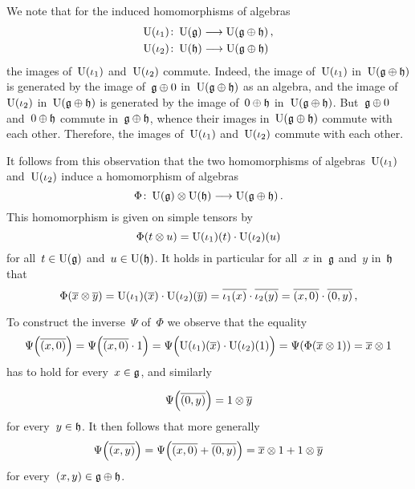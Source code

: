 \begin{example}
\begin{itemize}
			We note that for the induced homomorphisms of algebras
			\begin{align*}
				\Univ(\iota_1) &\colon \Univ(\glie) \to \Univ(\glie \oplus \hlie) \,, \\
				\Univ(\iota_2) &\colon \Univ(\hlie) \to \Univ(\glie \oplus \hlie)
			\end{align*}
			the images of~$\operatorname{U}(\iota_1)$ and~$\operatorname{U}(\iota_2)$ commute.
			Indeed, the image of~$\operatorname{U}(\iota_1)$ in~$\operatorname{U}(\mathfrak{g} \oplus \mathfrak{h})$ is generated by the image of~$\mathfrak{g} \oplus 0$ in~$\operatorname{U}(\mathfrak{g} \oplus \mathfrak{h})$ as an algebra, and the image of~$\operatorname{U}(\iota_2)$ in~$\operatorname{U}(\mathfrak{g} \oplus \mathfrak{h})$ is generated by the image of~$0 \oplus \mathfrak{h}$ in~$\operatorname{U}(\mathfrak{g} \oplus \mathfrak{h})$.
			But~$\mathfrak{g} \oplus 0$ and~$0 \oplus \mathfrak{h}$ commute in~$\mathfrak{g} \oplus \mathfrak{h}$, whence their images in~$\operatorname{U}(\mathfrak{g} \oplus \mathfrak{h})$ commute with each other.
			Therefore, the images of~$\operatorname{U}(\iota_1)$ and~$\operatorname{U}(\iota_2)$ commute with each other.

			It follows from this observation that the two homomorphisms of algebras~$\operatorname{U}( \iota_1 )$ and~$\operatorname{U}( \iota_2 )$ induce a homomorphism of algebras
			\[
				\Phi
				\colon
				\Univ(\glie) \tensor \Univ(\hlie)
				\to
				\Univ(\glie \oplus \hlie) \,.
			\]
			This homomorphism is given on simple tensors by
			\[
				\Phi(t \otimes u)
				=
				\operatorname{U}(\iota_1)(t) \cdot \operatorname{U}(\iota_2)(u)
			\]
			for all~$t \in \operatorname{U}(\mathfrak{g})$ and~$u \in \operatorname{U}(\mathfrak{h})$.
			It holds in particular for all~$x$ in~$\mathfrak{g}$ and~$y$ in~$\mathfrak{h}$ that
			\[
				\Phi(\overline{x} \otimes \overline{y})
				=
				\operatorname{U}(\iota_1)( \overline{x} )
				\cdot
				\operatorname{U}(\iota_2)( \overline{y} )
				=
				\overline{ \iota_1(x) }
				\cdot
				\overline{ \iota_2(y) }
				=
				\overline{(x,0)} \cdot \overline{(0,y)}  \,,
			\]

			To construct the inverse~$\Psi$ of~$\Phi$ we observe that the equality
			\[
				\Psi\Bigl( \overline{(x,0)} \Bigr)
				=
				\Psi\Bigl( \overline{(x,0)} \cdot 1 \Bigr)
				=
				\Psi\Bigl( \operatorname{U}(\iota_1)( \overline{x} ) \cdot \operatorname{U}(\iota_2)(1) \Bigr)
				=
				\Psi( \Phi( \overline{x} \otimes 1 ) )
				=
				\overline{x} \otimes 1
			\]
			has to hold for every~$x \in \mathfrak{g}$, and similarly
			
			\[
				\Psi\Bigl( \overline{(0,y)} \Bigr)
				=
				1 \otimes \overline{y}
			\]
			for every~$y \in \mathfrak{h}$.
			It then follows that more generally
			\[
				\Psi\Bigl( \overline{(x,y)} \Bigr)
				=
				\Psi\Bigl( \overline{(x,0)} + \overline{(0,y)} \Bigr)
				=
				\overline{x} \otimes 1 + 1 \otimes \overline{y}
			\]
			for every~$(x,y) \in \mathfrak{g} \oplus \mathfrak{h}$.
			

\end{itemize}
\end{example}
